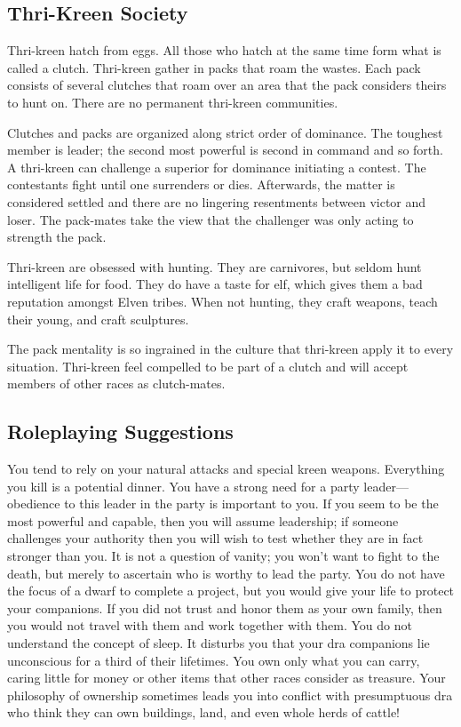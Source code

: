 \subsection{Thri-Kreen Society}
Thri-kreen hatch from eggs. All those who hatch at the same time form what is called a clutch. Thri-kreen gather in packs that roam the wastes. Each pack consists of several clutches that roam over an area that the pack considers theirs to hunt on. There are no permanent thri-kreen communities.

Clutches and packs are organized along strict order of dominance. The toughest member is leader; the second most powerful is second in command and so forth. A thri-kreen can challenge a superior for dominance initiating a contest. The contestants fight until one surrenders or dies. Afterwards, the matter is considered settled and there are no lingering resentments between victor and loser. The pack-mates take the view that the challenger was only acting to strength the pack.

Thri-kreen are obsessed with hunting. They are carnivores, but seldom hunt intelligent life for food. They do have a taste for elf, which gives them a bad reputation amongst Elven tribes. When not hunting, they craft weapons, teach their young, and craft sculptures.

The pack mentality is so ingrained in the culture that thri-kreen apply it to every situation. Thri-kreen feel compelled to be part of a clutch and will accept members of other races as clutch-mates.

\subsection{Roleplaying Suggestions}
You tend to rely on your natural attacks and special kreen weapons. Everything you kill is a potential dinner. You have a strong need for a party leader---obedience to this leader in the party is important to you. If you seem to be the most powerful and capable, then you will assume leadership; if someone challenges your authority then you will wish to test whether they are in fact stronger than you. It is not a question of vanity; you won't want to fight to the death, but merely to ascertain who is worthy to lead the party. You do not have the focus of a dwarf to complete a project, but you would give your life to protect your companions. If you did not trust and honor them as your own family, then you would not travel with them and work together with them. You do not understand the concept of sleep. It disturbs you that your dra companions lie unconscious for a third of their lifetimes. You own only what you can carry, caring little for money or other items that other races consider as treasure. Your philosophy of ownership sometimes leads you into conflict with presumptuous dra who think they can own buildings, land, and even whole herds of cattle!


